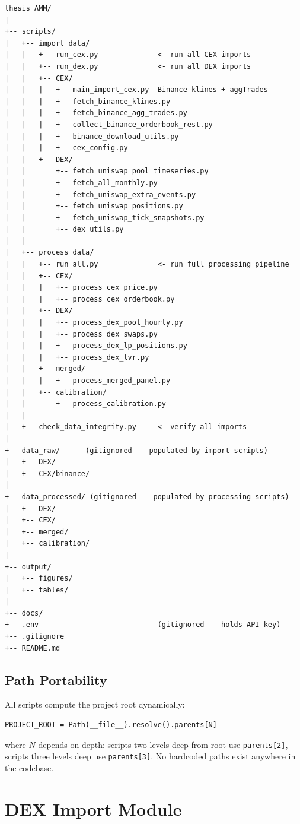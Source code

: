 \documentclass[11pt,a4paper]{article}
\begin{document}
\begin{lstlisting}
thesis_AMM/
|
+-- scripts/
|   +-- import_data/
|   |   +-- run_cex.py              <- run all CEX imports
|   |   +-- run_dex.py              <- run all DEX imports
|   |   +-- CEX/
|   |   |   +-- main_import_cex.py  Binance klines + aggTrades
|   |   |   +-- fetch_binance_klines.py
|   |   |   +-- fetch_binance_agg_trades.py
|   |   |   +-- collect_binance_orderbook_rest.py
|   |   |   +-- binance_download_utils.py
|   |   |   +-- cex_config.py
|   |   +-- DEX/
|   |       +-- fetch_uniswap_pool_timeseries.py
|   |       +-- fetch_all_monthly.py
|   |       +-- fetch_uniswap_extra_events.py
|   |       +-- fetch_uniswap_positions.py
|   |       +-- fetch_uniswap_tick_snapshots.py
|   |       +-- dex_utils.py
|   |
|   +-- process_data/
|   |   +-- run_all.py              <- run full processing pipeline
|   |   +-- CEX/
|   |   |   +-- process_cex_price.py
|   |   |   +-- process_cex_orderbook.py
|   |   +-- DEX/
|   |   |   +-- process_dex_pool_hourly.py
|   |   |   +-- process_dex_swaps.py
|   |   |   +-- process_dex_lp_positions.py
|   |   |   +-- process_dex_lvr.py
|   |   +-- merged/
|   |   |   +-- process_merged_panel.py
|   |   +-- calibration/
|   |       +-- process_calibration.py
|   |
|   +-- check_data_integrity.py     <- verify all imports
|
+-- data_raw/      (gitignored -- populated by import scripts)
|   +-- DEX/
|   +-- CEX/binance/
|
+-- data_processed/ (gitignored -- populated by processing scripts)
|   +-- DEX/
|   +-- CEX/
|   +-- merged/
|   +-- calibration/
|
+-- output/
|   +-- figures/
|   +-- tables/
|
+-- docs/
+-- .env                            (gitignored -- holds API key)
+-- .gitignore
+-- README.md
\end{lstlisting}

\subsection{Path Portability}

All scripts compute the project root dynamically:
\begin{lstlisting}
PROJECT_ROOT = Path(__file__).resolve().parents[N]
\end{lstlisting}
where $N$ depends on depth: scripts two levels deep from root use \texttt{parents[2]}, scripts three levels deep use \texttt{parents[3]}. No hardcoded paths exist anywhere in the codebase.

\section{DEX Import Module}
\end{document}
